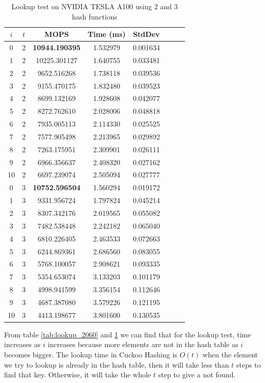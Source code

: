 \documentclass[10pt,twocolumn,letterpaper]{article}
\begin{document}
\begin{table}[!h]
    \centering
   \begin{tabular}{@{}c|ccccccc@{}}
\toprule
$i$ & $t$ & MOPS    & Time (ms)& StdDev  \\ \midrule
0 & 2 & \textbf{10944.190395} & 1.532979 & 0.001634 \\
1 & 2 & 10225.301127 & 1.640755 & 0.033481 \\
2 & 2 & 9652.516268 & 1.738118 & 0.039536 \\
3 & 2 & 9155.470175 & 1.832480 & 0.039523 \\
4 & 2 & 8699.132169 & 1.928608 & 0.042077 \\
5 & 2 & 8272.762610 & 2.028006 & 0.048818 \\
6 & 2 & 7935.005113 & 2.114330 & 0.025525 \\
7 & 2 & 7577.905498 & 2.213965 & 0.029892 \\
8 & 2 & 7263.175951 & 2.309901 & 0.026111 \\
9 & 2 & 6966.356637 & 2.408320 & 0.027162 \\
10 & 2 & 6697.239074 & 2.505094 & 0.027777 \\
0 & 3 & \textbf{10752.596504} & 1.560294 & 0.019172 \\
1 & 3 & 9331.956724 & 1.797824 & 0.045214 \\
2 & 3 & 8307.342176 & 2.019565 & 0.055082 \\
3 & 3 & 7482.538448 & 2.242182 & 0.065040 \\
4 & 3 & 6810.226405 & 2.463533 & 0.072663 \\
5 & 3 & 6244.869361 & 2.686560 & 0.083055 \\
6 & 3 & 5768.100057 & 2.908621 & 0.093335 \\
7 & 3 & 5354.653074 & 3.133203 & 0.101179 \\
8 & 3 & 4998.941599 & 3.356154 & 0.112646 \\
9 & 3 & 4687.387080 & 3.579226 & 0.121195 \\
10 & 3 & 4413.198677 & 3.801600 & 0.130535 \\
\bottomrule
\end{tabular}
    \caption{Lookup test on NVIDIA TESLA A100 using $2$ and $3$ hash functions}
    \label{tab:lookup_A100}
\end{table}

From table \ref{tab:lookup_2060} and \ref{tab:lookup_A100} we can find that for the lookup test, time increases as $i$ increases because more elements are not in the hash table as $i$ becomes bigger. The lookup time in Cuckoo Hashing is $O(t)$ when the element we try to lookup is already in the hash table, then it will take less than $t$ steps to find that key. Otherwise, it will take the whole $t$ step to give a not found.
\end{document}
